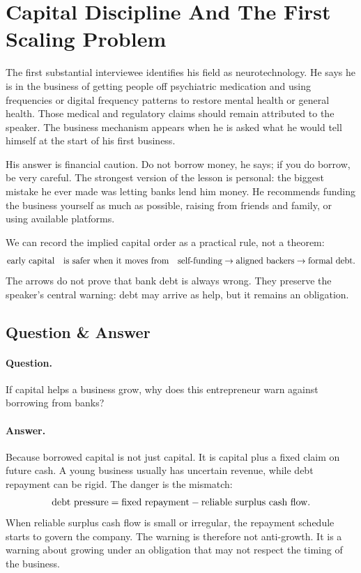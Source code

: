 \section{Capital Discipline And The First Scaling Problem}

The first substantial interviewee identifies his field as neurotechnology. He says he is in the business of getting people off psychiatric medication and using frequencies or digital frequency patterns to restore mental health or general health. Those medical and regulatory claims should remain attributed to the speaker. The business mechanism appears when he is asked what he would tell himself at the start of his first business.

His answer is financial caution. Do not borrow money, he says; if you do borrow, be very careful. The strongest version of the lesson is personal: the biggest mistake he ever made was letting banks lend him money. He recommends funding the business yourself as much as possible, raising from friends and family, or using available platforms.

We can record the implied capital order as a practical rule, not a theorem:
\begin{equation}
\hbox{early capital}
\quad\hbox{is safer when it moves from}\quad
\hbox{self-funding}
\rightarrow
\hbox{aligned backers}
\rightarrow
\hbox{formal debt}.
\end{equation}
The arrows do not prove that bank debt is always wrong. They preserve the speaker's central warning: debt may arrive as help, but it remains an obligation.

\subsection{Question \& Answer}

\paragraph{Question.}
If capital helps a business grow, why does this entrepreneur warn against borrowing from banks?

\paragraph{Answer.}
Because borrowed capital is not just capital. It is capital plus a fixed claim on future cash. A young business usually has uncertain revenue, while debt repayment can be rigid. The danger is the mismatch:
\begin{equation}
\hbox{debt pressure}
=
\hbox{fixed repayment}
-
\hbox{reliable surplus cash flow}.
\end{equation}
When reliable surplus cash flow is small or irregular, the repayment schedule starts to govern the company. The warning is therefore not anti-growth. It is a warning about growing under an obligation that may not respect the timing of the business.

